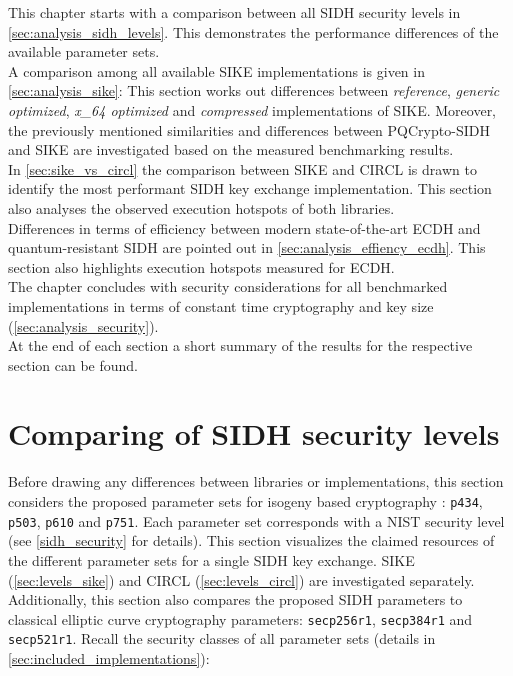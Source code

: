 This chapter starts with a comparison between all \gls{SIDH} security levels in \autoref{sec:analysis_sidh_levels}. This demonstrates the performance differences of the available parameter sets. \\
A comparison among all available \gls{SIKE} implementations is given in \autoref{sec:analysis_sike}: This section  works out differences between \textit{reference}, \textit{generic optimized}, \textit{x\_64 optimized} and \textit{compressed} implementations of SIKE. Moreover, the previously mentioned similarities and differences between \gls{PQCrypto-SIDH} and \gls{SIKE} are investigated based on the measured benchmarking results. \\
In \autoref{sec:sike_vs_circl} the comparison between \gls{SIKE} and \gls{CIRCL} is drawn to identify the most performant SIDH key exchange implementation. This section also analyses the observed execution hotspots of both libraries.\\
Differences in terms of efficiency between modern state-of-the-art \gls{ECDH} and quantum-resistant \gls{SIDH} are pointed out in \autoref{sec:analysis_effiency_ecdh}. This section also highlights execution hotspots measured for \gls{ECDH}.\\
The chapter concludes with security considerations for all benchmarked implementations in terms of constant time cryptography and key size (\autoref{sec:analysis_security}).\\
At the end of each section a short summary of the results for the respective section can be found. 

\section{Comparing of \gls{SIDH} security levels}\label{sec:analysis_sidh_levels}
Before drawing any differences between libraries or implementations, this section considers the proposed parameter sets for isogeny based cryptography \parencite{sike2020spec}: \texttt{p434}, \texttt{p503}, \texttt{p610} and \texttt{p751}. Each parameter set  corresponds with a  \gls{NIST} security level (see \autoref{sidh_security} for details). This section visualizes the claimed resources of the different parameter sets for a single \gls{SIDH} key exchange. \gls{SIKE} (\autoref{sec:levels_sike}) and \gls{CIRCL} (\autoref{sec:levels_circl}) are investigated separately. Additionally, this section also compares the proposed \gls{SIDH} parameters to classical elliptic curve cryptography parameters: \texttt{secp256r1}, \texttt{secp384r1} and \texttt{secp521r1}. Recall the security classes of all parameter sets (details in \autoref{sec:included_implementations}):


